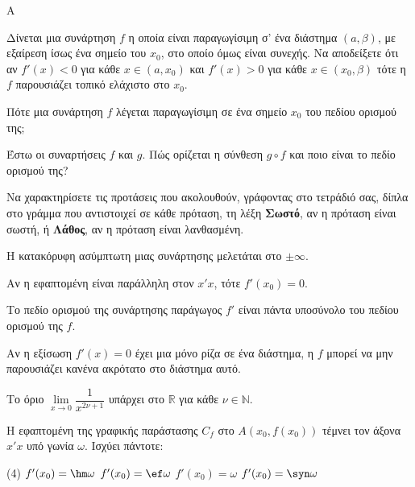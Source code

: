\begin{thema}{A}
\begin{erwthma}
    \item Δίνεται μια συνάρτηση $ f $ η οποία είναι παραγωγίσιμη σ’ ένα διάστημα $ (a,\beta) $, με εξαίρεση ίσως ένα σημείο του $ x_0 $, στο οποίο όμως είναι συνεχής. Να αποδείξετε ότι αν $ f'(x)<0 $ για κάθε $ x\in(a,x_0) $ και $ f'(x)>0 $ για κάθε $ x\in(x_0,\beta) $ τότε η $ f $ παρουσιάζει τοπικό ελάχιστο στο $ x_0 $.
    \item Πότε μια συνάρτηση $f$ λέγεται παραγωγίσιμη σε ένα σημείο $x_0$ του πεδίου ορισμού της;
    \item Έστω οι συναρτήσεις $f$ και $g$. Πώς ορίζεται η σύνθεση $g \circ f$ και ποιο είναι το πεδίο ορισμού της?
    \item Να χαρακτηρίσετε τις προτάσεις που ακολουθούν, γράφοντας στο τετράδιό σας, δίπλα στο γράμμα που αντιστοιχεί σε κάθε πρόταση, τη λέξη \textbf{Σωστό}, αν η πρόταση είναι σωστή, ή \textbf{Λάθος}, αν η πρόταση είναι λανθασμένη.
    \begin{alist}
        \item Η κατακόρυφη ασύμπτωτη μιας συνάρτησης μελετάται στο $\pm \infty$.
        \item Αν η εφαπτομένη είναι παράλληλη στον $x'x$, τότε $f'(x_0) = 0$.
        \item Το πεδίο ορισμού της συνάρτησης παράγωγος $f'$ είναι πάντα υποσύνολο του πεδίου ορισμού της $f$.
        \item Αν η εξίσωση $f'(x)=0$ έχει μια μόνο ρίζα σε ένα διάστημα, η $f$ μπορεί να μην παρουσιάζει κανένα ακρότατο στο διάστημα αυτό.
        \item Το όριο $\lim\limits_{x\to 0}{\dfrac{1}{x^{2\nu+1}}}$ υπάρχει στο $\mathbb{R}$ για κάθε $\nu \in \mathbb{N}$.
    \end{alist}
    \item Η εφαπτομένη της γραφικής παράστασης $C_f$ στο $A(x_0, f(x_0))$ τέμνει τον άξονα $x'x$ υπό γωνία $\omega$. Ισχύει πάντοτε:
    \begin{tasks}[label=\let\textdexiakeraia\relax\alph*.](4)
        \task $f'(x_0) = \hm \omega$
        \task $f'(x_0) = \ef \omega$
        \task $f'(x_0) = \omega$
        \task $f'(x_0) = \syn \omega$
    \end{tasks}


    \newpage
\end{erwthma}
\end{thema}


